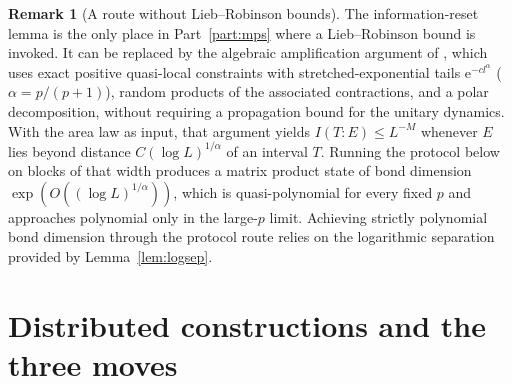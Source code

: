 \documentclass[aps,prx,reprint,superscriptaddress,floatfix,nofootinbib,longbibliography,amsmath,amssymb]{revtex4-2}
\newcommand{\e}{\mathrm e}
\theoremstyle{plain}
\theoremstyle{definition}
\newtheorem{remark}[theorem]{Remark}
\begin{document}
\begin{remark}[A route without Lieb--Robinson bounds]\label{rem:LRfree}
The information-reset lemma is the only place in Part~\ref{part:mps} where a
Lieb--Robinson bound is invoked. It can be replaced by the algebraic amplification
argument of \cite[Section~10]{AL}, which uses exact positive quasi-local
constraints with stretched-exponential tails $\e^{-cl^\alpha}$
($\alpha=p/(p+1)$), random products of the associated contractions, and a
polar decomposition, without requiring a propagation bound for the unitary
dynamics. With the area law as input, that argument yields
$I(T:E)\le L^{-M}$ whenever $E$ lies beyond distance $C(\log L)^{1/\alpha}$ of an
interval $T$. Running the protocol below on blocks of that width produces
a matrix product state of bond dimension $\exp(O((\log L)^{1/\alpha}))$, which is
quasi-polynomial for every fixed $p$ and approaches polynomial only in the large-$p$ limit.
Achieving strictly polynomial bond dimension through the protocol route relies on the
logarithmic separation provided by Lemma~\ref{lem:logsep}.
\end{remark}
\section{Distributed constructions and the three moves}\label{sec:moves}
\end{document}
